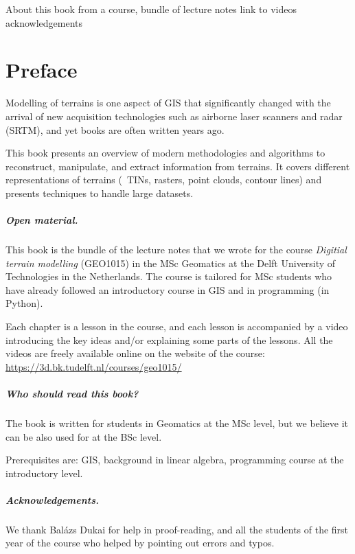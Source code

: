 
About this book
from a course, bundle of lecture notes
link to videos
acknowledgements


\chapter*{Preface}

Modelling of terrains is one aspect of GIS that significantly changed with the arrival of new acquisition technologies such as airborne laser scanners and radar (SRTM), and yet books are often written years ago.


This book presents an overview of modern methodologies and algorithms to reconstruct, manipulate, and extract information from terrains.
It covers different representations of terrains (\eg\ TINs, rasters, point clouds, contour lines) and presents techniques to handle large datasets.

\paragraph*{Open material.}
This book is the bundle of the lecture notes that we wrote for the course \emph{Digitial terrain modelling} (GEO1015) in the MSc Geomatics at the Delft University of Technologies in the Netherlands.
The course is tailored for MSc students who have already followed an introductory course in GIS and in programming (in Python).

Each chapter is a lesson in the course, and each lesson is accompanied by a video introducing the key ideas and/or explaining some parts of the lessons.
All the videos are freely available online on the website of the course: \url{https://3d.bk.tudelft.nl/courses/geo1015/}


\paragraph*{Who should read this book?}
The book is written for students in Geomatics at the MSc level, but we believe it can be also used for at the BSc level.

Prerequisites are: GIS, background in linear algebra, programming course at the introductory level.

\paragraph*{Acknowledgements.}
We thank Balázs Dukai for help in proof-reading, and all the students of the first year of the course who helped by pointing out errors and typos.







